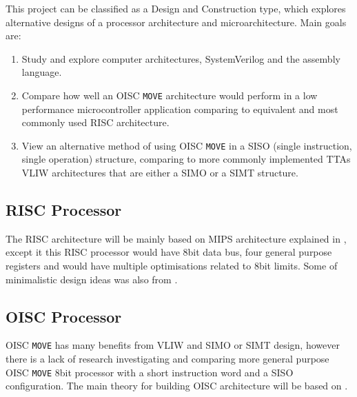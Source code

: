 \iffalse
This chapter describes your Goals and Objectives. 
Indicate how your work is intended to expand on previous historical work.
Present your motivations; why are you doing this?
Indicate the type of project you have(see the list above).

Types of Projects:
2) Design and Construction projects:
These types of projects involve the design and construction of some 
electrical or electronic apparatus or device within the bounds 
of the department's educational mandate.
\fi


This project can be classified as a Design and Construction type, which explores alternative designs of a processor architecture and microarchitecture. Main goals are:
\begin{enumerate}
	\item Study and explore computer architectures, SystemVerilog and the assembly language. 
	\item Compare how well an OISC \texttt{MOVE} architecture would perform in a low performance microcontroller application comparing to equivalent and most commonly used RISC architecture.
	\item View an alternative method of using OISC \texttt{MOVE} in a SISO (single instruction, single operation) structure, comparing to more commonly implemented TTAs VLIW architectures that are either a SIMO or a SIMT structure.
\end{enumerate}



\subsection{RISC Processor}
The RISC architecture will be mainly based on MIPS architecture explained in \autocite{harris_harris_2013}, except it this RISC processor would have 8bit data bus, four general purpose registers and would have multiple optimisations related to 8bit limits. Some of minimalistic design ideas was also from \autocite{gilreath_laplante_2003}.


\subsection{OISC Processor}
OISC \texttt{MOVE} has many benefits from VLIW and SIMO or SIMT design, however there is a lack of research investigating and comparing more general purpose OISC \texttt{MOVE} 8bit processor with a short instruction word and a SISO configuration. The main theory for building OISC architecture will be based on \autocite{gilreath_laplante_2003}.

